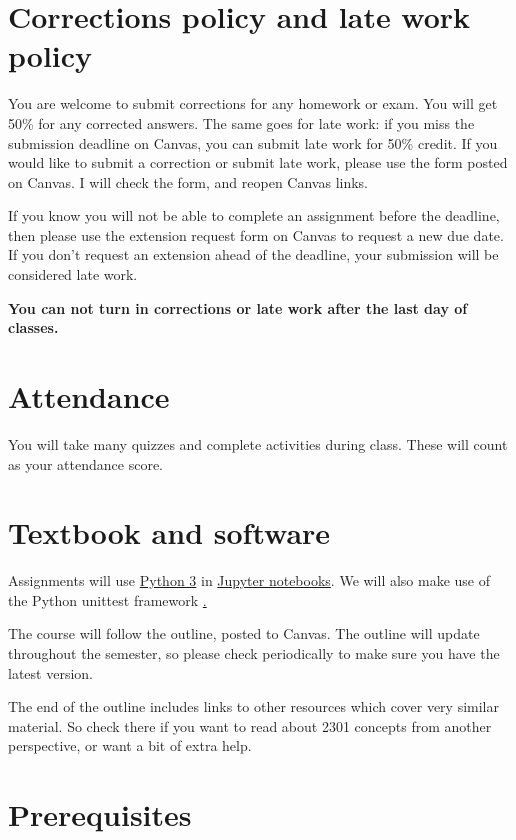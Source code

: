 \documentclass[10pt]{memoir}
\begin{document}
\section{\textbf{Corrections policy and late work policy}}
You are welcome to submit corrections for any homework or exam. You will get 50\% for any corrected answers. The same goes for late work: if you miss the submission deadline on Canvas, you can submit late work for 50\% credit. If you would like to submit a correction or submit late work, please use the form posted on Canvas. I will check the form, and reopen Canvas links. 

If you know you will not be able to complete an assignment before the deadline, then please use the extension request form on Canvas to request a new due date. If you don't request an extension ahead of the deadline, your submission will be considered late work.

\textbf{You can not turn in corrections or late work after the last day of classes.}

\section{\textbf{Attendance}}
You will take many quizzes and complete activities during class. These will count as your attendance score. 

\section{\textbf{Textbook and software}}

Assignments will use \href{https://www.python.org/}{Python 3} in \href{https://jupyter.org/}{Jupyter notebooks}. We will also make use of the Python unittest framework \href{https://docs.python.org/3/library/unittest.html}.

The course will follow the outline, posted to Canvas. The outline will update throughout the semester, so please check periodically to make sure you have the latest version. 

The end of the outline includes links to other resources which cover very similar material. So check there if you want to read about 2301 concepts from another perspective, or want a bit of extra help. 

\section{\textbf{Prerequisites}}
\end{document}
